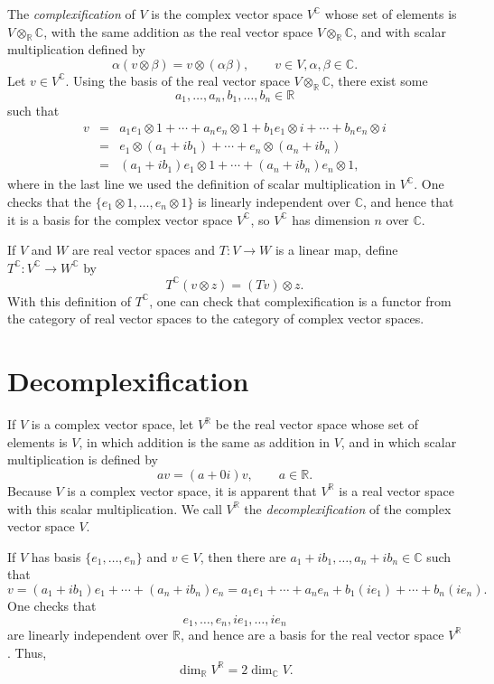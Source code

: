\documentclass{article}
\begin{document}
The {\em complexification} of $V$ is the
complex vector space $V^\mathbb{C}$ whose set of elements is $V \otimes_{\mathbb{R}} \mathbb{C}$, with the same addition
as the real vector space $V \otimes_{\mathbb{R}} \mathbb{C}$, and with scalar multiplication defined by
\[
\alpha(v \otimes \beta)=v \otimes (\alpha \beta), \qquad v \in V, \alpha,\beta \in \mathbb{C}.
\]
Let $v \in V^\mathbb{C}$. Using the basis of the real vector space $V \otimes_{\mathbb{R}} \mathbb{C}$, there exist some 
\[
a_1,\ldots,a_n,b_1,\ldots,b_n \in \mathbb{R}
\]
 such that
\begin{eqnarray*}
v&=&a_1 e_1 \otimes 1 + \cdots + a_n e_n \otimes 1 + b_1 e_1 \otimes i + \cdots + b_n e_n \otimes i\\
&=&e_1 \otimes (a_1+ib_1) + \cdots +e_n \otimes (a_n + ib_n)\\
&=&(a_1+ib_1) e_1 \otimes 1 + \cdots + (a_n+ib_n) e_n \otimes 1,
\end{eqnarray*}
where in the last line we used the definition of scalar multiplication in $V^\mathbb{C}$. One checks
that the 
$\{e_1 \otimes 1,\ldots, e_n \otimes 1\}$ is linearly independent over $\mathbb{C}$, and hence that it is a basis for the complex vector space $V^\mathbb{C}$,
so $V^\mathbb{C}$ has dimension $n$ over $\mathbb{C}$.

If $V$ and $W$ are real vector spaces and $T:V \to W$ is a linear map, define $T^\mathbb{C}:V^\mathbb{C} \to W^\mathbb{C}$ by
\[
T^\mathbb{C}(v \otimes z)=(Tv) \otimes z.
\]
With this definition of $T^\mathbb{C}$, one can check that complexification is a functor from the category of real vector
spaces to the category of complex vector spaces.


\section{Decomplexification}
If $V$ is a complex vector space, let $V^\mathbb{R}$ be the real vector space whose set of elements is $V$, in which addition is the same as addition
in $V$, and in which scalar multiplication is defined by
\[
av=(a+0i)v, \qquad a \in \mathbb{R}.
\]
Because $V$ is a complex vector space, it is apparent that $V^\mathbb{R}$ is  a real vector space with this scalar multiplication.
We call $V^\mathbb{R}$ the {\em decomplexification} of the complex vector space $V$.

If $V$ has basis $\{e_1,\ldots,e_n\}$ and $v \in V$,
then there are $a_1+ib_1,\ldots,a_n+ib_n \in \mathbb{C}$ such that
\[
v=(a_1+ib_1)e_1+\cdots+(a_n+ib_n)e_n=a_1e_1+\cdots+a_ne_n+b_1(ie_1)+\cdots+
b_n(ie_n).
\]
One checks that 
\[
e_1,\ldots,e_n,ie_1,\ldots,ie_n
\]
are linearly independent over $\mathbb{R}$, and hence are a basis for the real vector space $V^\mathbb{R}$. Thus, 
\[
\dim_\mathbb{R} V^\mathbb{R} = 2\dim_\mathbb{C} V.
\]
\end{document}
